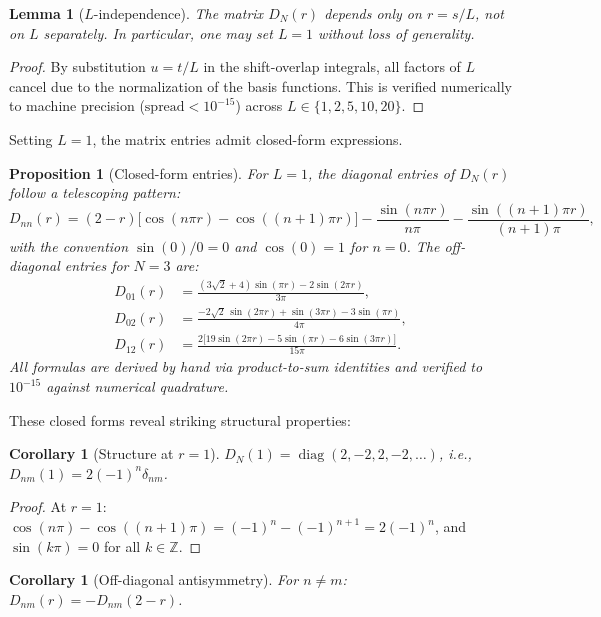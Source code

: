 \documentclass[12pt,a4paper]{article}
\newtheorem{lemma}[theorem]{Lemma}
\newtheorem{proposition}[theorem]{Proposition}
\newtheorem{corollary}[theorem]{Corollary}
\theoremstyle{definition}
\theoremstyle{remark}
\begin{document}
\begin{lemma}[$L$-independence]
\label{lem:L-indep}
The matrix $D_N(r)$ depends only on $r = s/L$, not on $L$ separately. In particular, one may set $L = 1$ without loss of generality.
\end{lemma}

\begin{proof}
By substitution $u = t/L$ in the shift-overlap integrals, all factors of $L$ cancel due to the normalization of the basis functions. This is verified numerically to machine precision ($\text{spread} < 10^{-15}$) across $L \in \{1, 2, 5, 10, 20\}$.
\end{proof}

Setting $L=1$, the matrix entries admit closed-form expressions.

\begin{proposition}[Closed-form entries]
\label{prop:closed-form}
For $L = 1$, the diagonal entries of $D_N(r)$ follow a telescoping pattern:
\[
  D_{nn}(r) = (2-r)\bigl[\cos(n\pi r) - \cos((n{+}1)\pi r)\bigr]
  - \frac{\sin(n\pi r)}{n\pi} - \frac{\sin((n{+}1)\pi r)}{(n{+}1)\pi},
\]
with the convention $\sin(0)/0 = 0$ and $\cos(0) = 1$ for $n = 0$. The off-diagonal entries for $N = 3$ are:
\begin{align*}
  D_{01}(r) &= \frac{(3\sqrt{2}+4)\sin(\pi r) - 2\sin(2\pi r)}{3\pi}, \\
  D_{02}(r) &= \frac{-2\sqrt{2}\,\sin(2\pi r) + \sin(3\pi r) - 3\sin(\pi r)}{4\pi}, \\
  D_{12}(r) &= \frac{2\bigl[19\sin(2\pi r) - 5\sin(\pi r) - 6\sin(3\pi r)\bigr]}{15\pi}.
\end{align*}
All formulas are derived by hand via product-to-sum identities and verified to $10^{-15}$ against numerical quadrature.
\end{proposition}

These closed forms reveal striking structural properties:

\begin{corollary}[Structure at $r = 1$]
\label{cor:r-one}
$D_N(1) = \operatorname{diag}(2, -2, 2, -2, \ldots)$, i.e., $D_{nm}(1) = 2(-1)^n \delta_{nm}$.
\end{corollary}

\begin{proof}
At $r = 1$: $\cos(n\pi) - \cos((n{+}1)\pi) = (-1)^n - (-1)^{n+1} = 2(-1)^n$, and $\sin(k\pi) = 0$ for all $k \in \mathbb{Z}$.
\end{proof}

\begin{corollary}[Off-diagonal antisymmetry]
\label{cor:antisym}
For $n \neq m$: $D_{nm}(r) = -D_{nm}(2-r)$.
\end{corollary}
\end{document}
